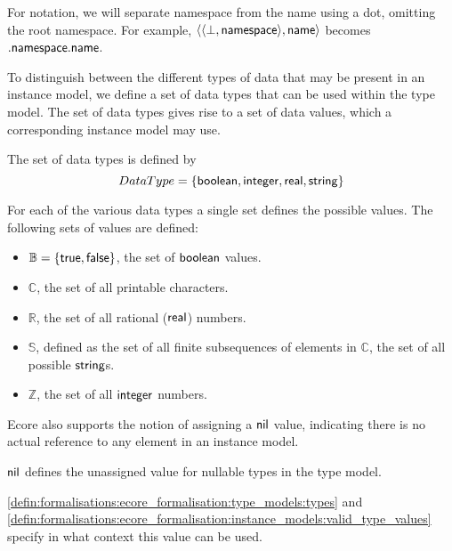 For notation, we will separate namespace from the name using a dot, omitting the root namespace. For example, $\langle\langle\perp, \mathsf{namespace}\rangle, \mathsf{name}\rangle$ becomes $.\mathsf{namespace}.\mathsf{name}$.

To distinguish between the different types of data that may be present in an instance model, we define a set of data types that can be used within the type model. The set of data types gives rise to a set of data values, which a corresponding instance model may use.

\begin{defin}
\label{defin:formalisations:ecore_formalisation:definitions:data_types}
The set of data types is defined by
\begin{equation*}
DataType = \{ \mathsf{boolean}, \mathsf{integer}, \mathsf{real}, \mathsf{string} \}
\end{equation*}
\end{defin}

\begin{defin}
\label{defin:formalisations:ecore_formalisation:definitions:data_type_values}
For each of the various data types a single set defines the possible values. The following sets of values are defined:
\begin{itemize}
    \item $\mathbb{B} = \{ \mathsf{true}, \mathsf{false} \}$, the set of $\mathsf{boolean}$ values.
    \item $\mathbb{C}$, the set of all printable characters.
    \item $\mathbb{R}$, the set of all rational ($\mathsf{real}$) numbers.
    \item $\mathbb{S}$, defined as the set of all finite subsequences of elements in $\mathbb{C}$, the set of all possible $\mathsf{string}$s.
    \item $\mathbb{Z}$, the set of all $\mathsf{integer}$ numbers.
\end{itemize}
\end{defin}

Ecore also supports the notion of assigning a $\mathsf{nil}$ value, indicating there is no actual reference to any element in an instance model.

\begin{defin}
\label{defin:formalisations:ecore_formalisation:definitions:nil}
$\mathsf{nil}$ defines the unassigned value for nullable types in the type model.
\end{defin}

\cref{defin:formalisations:ecore_formalisation:type_models:types} and \cref{defin:formalisations:ecore_formalisation:instance_models:valid_type_values} specify in what context this value can be used.